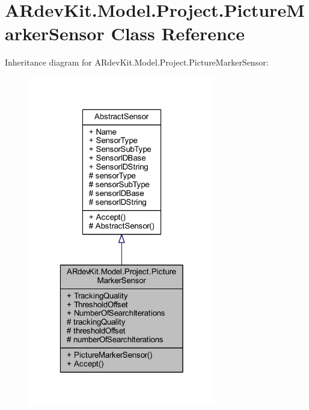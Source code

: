 \hypertarget{class_a_rdev_kit_1_1_model_1_1_project_1_1_picture_marker_sensor}{\section{A\-Rdev\-Kit.\-Model.\-Project.\-Picture\-Marker\-Sensor Class Reference}
\label{class_a_rdev_kit_1_1_model_1_1_project_1_1_picture_marker_sensor}
}


Inheritance diagram for A\-Rdev\-Kit.\-Model.\-Project.\-Picture\-Marker\-Sensor\-:
\nopagebreak
\begin{figure}[H]
\begin{center}
\leavevmode
\includegraphics[width=232pt]{class_a_rdev_kit_1_1_model_1_1_project_1_1_picture_marker_sensor__inherit__graph}
\end{center}
\end{figure}


